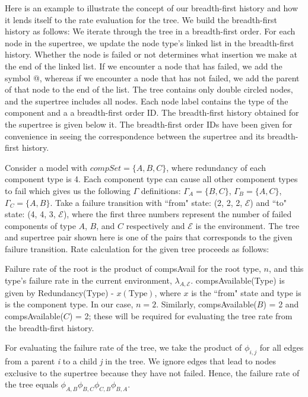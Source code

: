 \documentclass{article}
\newcommand{\varName}[1]{\textrm{\it#1}}
\begin{document}
\fi

Here is an example to illustrate the concept of our breadth-first history and how it lends itself to the rate evaluation for the tree. We build the breadth-first history as follows: We iterate through the tree in a breadth-first order. For each node in the supertree, we update the node type's linked list in the breadth-first history. Whether the node is failed or not determines what insertion we make at the end of the linked list. If we encounter a node that has failed, we add the symbol @, whereas if we encounter a node that has not failed, we add the parent of that node to the end of the list. The tree contains only double circled nodes, and the supertree includes all nodes. Each node label contains the type of the component and a a breadth-first order ID. The breadth-first history obtained for the supertree is given below it. The breadth-first order IDs have been given for convenience in seeing the correspondence between the supertree and its breadth-first history.

Consider a model with $compSet = \{A, B, C\}$, where redundancy of each component type is 4. Each component type can cause all other component types to fail which gives us the following $\Gamma$ definitions: $\Gamma_{A} = \{B, C\}$, $\Gamma_{B} = \{A, C\}$, $\Gamma_{C} = \{A, B\}$. Take a failure transition with ``from" state: (2, 2, 2, $\mathcal{E}$) and ``to" state: (4, 4, 3, $\mathcal{E}$), where the first three numbers represent the number of failed components of type $A$, $B$, and $C$ respectively and $\mathcal{E}$ is the environment. The tree and supertree pair shown here is one of the pairs that corresponds to the given failure transition. Rate calculation for the given tree proceeds as follows:

Failure rate of the root is the product of compsAvail for the root type, $n$, and this type's failure rate in the current environment, $\lambda_{A, \mathcal{E}}$. compsAvailable(Type) is given by Redundancy(Type) -  $x(\mbox{Type})$, where $x$ is the ``from" state and type is is the component type. In our case, $n = 2$. Similarly, compsAvailable($B$) = 2 and compsAvailable($C$) = 2; these will be required for evaluating the tree rate from the breadth-first history.

For evaluating the failure rate of the tree, we take the product of $\phi_{i,j}$ for all edges from a parent \varName{i} to a child \varName{j} in the tree. We ignore edges that lead to nodes exclusive to the supertree because they have not failed. Hence, the failure rate of the tree equals $\phi_{A, B} \phi_{B, C} \phi_{C, B} \phi_{B, A}$.
\end{document}

